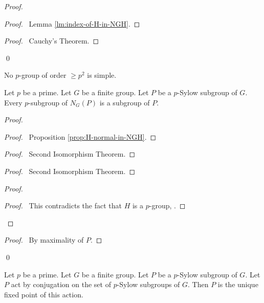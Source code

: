 \begin{proof}
\pf
{}
\begin{proof}
	\pf\ Lemma \ref{lm:index-of-H-in-NGH}.
\end{proof}
\begin{proof}
	\pf\ Cauchy's Theorem.
\end{proof}
\qed
\end{proof}

\begin{cor}
\label{cor:p-squared-not-simple}
No $p$-group of order $\geq p^2$ is simple.
\end{cor}

\begin{lm}
\label{lm:third-sylow-1}
Let $p$ be a prime. Let $G$ be a finite group. Let $P$ be a $p$-Sylow subgroup of $G$. Every $p$-subgroup of $N_G(P)$ is a subgroup of $P$.
\end{lm}

\begin{proof}
\pf
{}
\begin{proof}
	\pf\ Proposition \ref{prop:H-normal-in-NGH}.
\end{proof}
\begin{proof}
	\pf\ Second Isomorphism Theorem.
\end{proof}
\begin{proof}
	\pf\ Second Isomorphism Theorem.
\end{proof}
\begin{proof}
	\qedstep
	\begin{proof}
		\pf\ This contradicts the fact that $H$ is a $p$-group, .
	\end{proof}
\end{proof}
\begin{proof}
	\pf\ By maximality of $P$.
\end{proof}
\qed
\end{proof}

\begin{lm}
\label{lm:third-sylow-2}
Let $p$ be a prime. Let $G$ be a finite group. Let $P$ be a $p$-Sylow subgroup of $G$. Let $P$ act by conjugation on the set of $p$-Sylow subgroups of $G$. Then $P$ is the unique fixed point of this action.
\end{lm}

